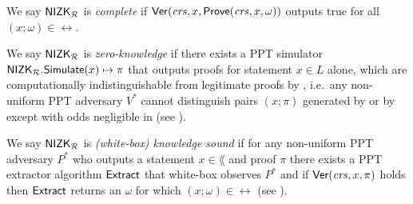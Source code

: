 \begin{comment}
We always describe circuits as languages $\lang$ and write $\NIZK_\lang$ for two reasons: 
All SNARK circuits have many logic wires in \rel other than
the public input wires $x$ and the secret input witness wires $\omega$.
An existential quantifiers $\exists$ more clearly distinguishs
public inputs $x$ from secret input witnesses $\omega$ than tuple position.
We also benefited from language in the preceding informal exposition,
 which did not always require specifying $\omega$.
\end{comment}

\begin{definition}\label{def:nizk_completeness}
We say ${\mathsf{NIZK}}_\mathcal{R}$ is {\em complete} if ${\mathsf{Ver}}(\mathit{crs}, x, {\mathsf{Prove}}(\mathit{crs}, x, \omega))$ outputs true for all $(x; \omega) \in \rel$.  %
\end{definition}

\def\advV{\ensuremath{V^*}\xspace} %

\begin{definition}\label{def:nizk_zero_knowledge}
We say ${\mathsf{NIZK}}_\mathcal{R}$ is {\em zero-knowledge} if
there exists a PPT simulator ${\mathsf{NIZK}}_\mathcal{R}.{\mathsf{Simulate}}(x) \mapsto \pi$
that outputs proofs for statement $x \in L$ alone, which are
computationally indistinguishable from legitimate proofs by \Prove,
i.e.\ any non-uniform PPT adversary \advV cannot distinguish pairs $(x; \pi)$
generated by \Simulate or by \Prove except with odds negligible in \secparam
(see \cite[Def. 9, \S A, pap. 29]{RandomizationGroth16}). %
\end{definition}

\def\advP{\ensuremath{P^*}\xspace} %

\begin{definition}\label{def:nizk_knowledge_sound}
We say ${\mathsf{NIZK}}_\mathcal{R}$ is {\em (white-box) knowledge sound} if
for any non-uniform PPT adversary \advP who outputs a statement $x \in \lang$ and proof $\pi$
there exists a PPT extractor algorithm ${\mathsf{Extract}}$ that white-box observes $\advP$ and
if ${\mathsf{Ver}}(\mathit{crs}, x, \pi)$ holds then ${\mathsf{Extract}}$ returns an $\omega$ for which $(x; \omega) \in \rel$
(see \cite[Def. 7, \S A, pap. 29]{RandomizationGroth16}).
\end{definition}

\begin{comment}
Our zero-knowledge continuations in \S\ref{sec:rvrf_cont} demand
rerandomizing existing zkSNARKs, which only Groth16 supports \cite{Groth16}.
We therefore introduce some details of Groth16 \cite{Groth16} there,
when we tamper with Groth16's SRS and $\mathtt{Setup}$ to create zero-knowledge continuations. 
\end{comment}

